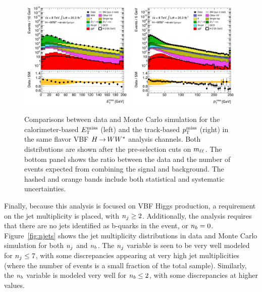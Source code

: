 \begin{figure}[h!]
  \centering
  \captionsetup{justification=centering}
  \includegraphics[width=0.49\textwidth]{figures/VBF_cb_met}
  \includegraphics[width=0.49\textwidth]{figures/VBF_cb_trackmet}

  \caption{Comparisons between data and Monte Carlo simulation for the calorimeter-based $E_{\textrm{\footnotesize\sc t}}^{\rm miss}$ (left) and the track-based $p_{\textrm{\footnotesize\sc t}}^{\rm miss}$ (right) in the same flavor VBF $H{\,{\rightarrow}\,}WW^\ast$ analysis channels. Both distributions are shown after the pre-selection cuts on $m_{\ell\ell}$. The bottom panel shows the ratio between the data and the number of events expected from combining the signal and background. The hashed and orange bands include both statistical and systematic uncertainties.}
  \label{fig:VBF_cb_met}
\end{figure}

Finally, because this analysis is focused on VBF Higgs production, a requirement on the jet multiplicity is placed, with $n_j \geq 2$. Additionally, the analysis requires that there are no jets identified as b-quarks in the event, or $n_b = 0$. Figure~\ref{fig:njets} shows the jet multiplicity distributions in data and Monte Carlo simulation for both $n_j$ and $n_b$. The $n_j$ variable is seen to be very well modeled for $n_j \leq 7$, with some discrepancies appearing at very high jet multiplicities (where the number of events is a small fraction of the total sample). Similarly, the $n_b$ variable is modeled very well for $n_b \leq 2$, with some discrepancies at higher values. 

